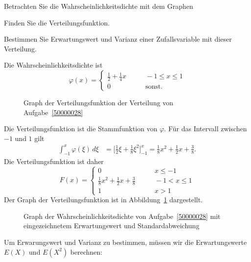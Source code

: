 Betrachten Sie die Wahrscheinlichkeitsdichte mit dem Graphen
\begin{center}
\end{center}
\begin{teilaufgaben}
\item Finden Sie die Verteilungsfunktion.
\item Bestimmen Sie Erwartungswert und Varianz einer Zufallsvariable
mit dieser Verteilung.
\end{teilaufgaben}


\begin{loesung}
Die Wahrscheinlichkeitsdichte ist 
\[
\varphi(x)=\begin{cases}
\frac12+\frac14x&\qquad -1\le x\le 1\\
0&\qquad\text{sonst.}
\end{cases}
\]
\begin{teilaufgaben}
\item
\begin{figure}
\centering
{}
\caption{Graph der Verteilungsfunktion der Verteilung von
Aufgabe~\ref{50000028}
\label{50000028:verteilungsfunktion}}
\end{figure}
Die Verteilungsfunktion ist die Stammfunktion von $\varphi$.
Für das Intervall zwischen $-1$ und $1$ gilt
\begin{align*}
\int_{-1}^x\varphi(\xi)\,d\xi
&=
\biggl[\frac12 \xi+\frac18\xi^2\biggr]_{-1}^x
=
\frac18x^2+\frac12x+\frac{3}{8}.
\end{align*}
Die Verteilungsfunktion ist daher
\[
F(x)=\begin{cases}
0&\qquad x \le -1\\
\frac18x^2+\frac12x+\frac{3}{8}
&\qquad -1 < x\le 1\\
1&\qquad x >1
\end{cases}
\]
Der Graph der Verteilungsfunktion ist in
Abbildung~\ref{50000028:verteilungsfunktion} dargestellt.
\item
\begin{figure}
\centering
{}
\caption{Graph der Wahrscheinlichkeitsdichte von Aufgabe~\ref{50000028}
mit eingezeichnetem Erwartungswert und Standardabweichung
\label{50000028:varianz}}
\end{figure}
Um Erwarungswert und Varianz zu bestimmen, müssen wir die Erwartungswerte
$E(X)$ und $E(X^2)$ berechnen:

\end{teilaufgaben}
\end{loesung}
